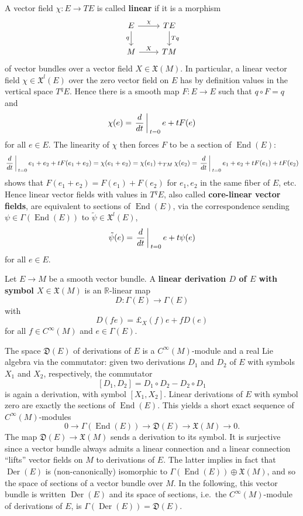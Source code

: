 \documentclass{amsart}
\theoremstyle{plain}
\newcommand{\lie}[1]{\mathfrak{#1}}
\newcommand{\R}{\mathbb{R}}
\newcommand{\mx}{\mathfrak{X}}
\newcommand{\ldr}[1]{{{\pounds}}_{#1}}
\newcommand{\an}[1]{\arrowvert_{#1}}
\begin{document}
A vector field $\chi\colon E\to TE$ is called \textbf{linear} if it is a morphism 
\[\begin{tikzcd}
	{E} & {TE} \\
	{M} & {TM}
	\arrow["{q}"', from=1-1, to=2-1]
	\arrow["\chi", from=1-1, to=1-2]
	\arrow["{Tq}", from=1-2, to=2-2]
	\arrow["X", from=2-1, to=2-2]
\end{tikzcd}\]
of vector bundles over a vector field $X\in\mx(M)$. 
In particular, a linear vector field $\chi\in\mx^l(E)$ over the zero vector field on $E$ has by definition values in the vertical space $T^qE$. Hence there is a smooth map $F\colon E\to E$ such that $q\circ F=q$ and  
\[ \chi(e)=\left.\frac{d}{dt}\right\an{t=0} e+tF(e)
\]
for all $e\in E$.
The linearity of $\chi$ then forces $F$ to be a section of $\operatorname{End}(E)$:
\[
\left.\frac{d}{dt}\right\an{t=0} e_1+e_2+tF(e_1+e_2)=\chi(e_1+e_2)=\chi(e_1)+_{TM}\chi(e_2)=\left.\frac{d}{dt}\right\an{t=0} e_1+e_2+tF(e_1)+tF(e_2)
\]
shows that $F(e_1+e_2)=F(e_1)+F(e_2)$ for $e_1,e_2$ in the same fiber of $E$, etc. Hence linear vector fields with values in $T^qE$, also called \textbf{core-linear vector fields}, are equivalent to sections of $\operatorname{End}(E)$, via the correspondence sending $\psi\in\Gamma(\operatorname{End}(E))$ to $\tilde \psi\in \mx^l(E)$, 
\[ \tilde\psi(e)=\left.\frac{d}{dt}\right\an{t=0} e+t\psi(e)
\]
for all $e\in E$.

\bigskip



Let $E\to M$ be a smooth vector bundle. 
A \textbf{linear derivation $D$ of $E$ with symbol $X\in\mx(M)$} is an $\R$-linear map
\[ D\colon \Gamma(E)\to \Gamma(E)
\]
with 
\[D(fe)=\ldr{X}(f)e+fD(e)
\]
for all  $f\in C^\infty(M)$ and $e\in\Gamma(E)$. 



The space $\lie D(E)$ of derivations of $E$ is a $C^\infty(M)$-module and a real Lie algebra via the commutator: given two derivations  $D_1$ and $D_2$ of $E$ with symbols $X_1$ and $X_2$, respectively, 
the commutator
\[ [D_1, D_2]=D_1\circ D_2- D_2\circ D_1
\]
is again a derivation, with symbol $[X_1,X_2]$. Linear derivations of $E$ with symbol zero are exactly the sections of $\operatorname{End}(E)$.
This yields a short exact sequence of $C^\infty(M)$-modules 
\begin{equation}\label{ses}0\rightarrow \Gamma(\operatorname{End}(E))\rightarrow \lie D(E)\rightarrow \mx(M)\rightarrow 0.
\end{equation}
The map $\lie D(E)\rightarrow \mx(M)$ sends a derivation to its symbol. It is surjective since  a vector bundle always admits a linear connection and a linear connection ``lifts'' vector fields on $M$ to derivations of $E$.
The latter implies in fact that $\operatorname{Der}(E)$ is (non-canonically) isomorphic to $\Gamma(\operatorname{End}(E))\oplus \mx(M)$, and so the space of sections of a vector bundle over $M$. In the following, this vector bundle is written $\operatorname{Der}(E)$ and its space of sections, i.e.~the $C^\infty(M)$-module of derivations of $E$, is  $\Gamma(\operatorname{Der}(E))=\lie D(E)$.
\end{document}

